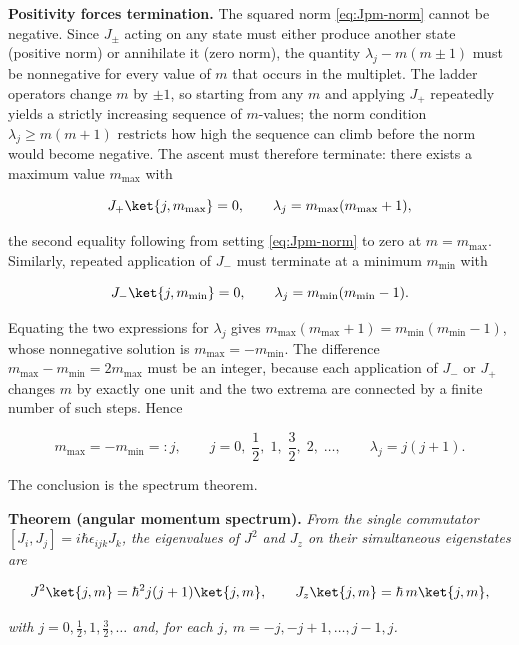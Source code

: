 \medskip\noindent\textbf{Positivity forces termination.} The squared norm \eqref{eq:Jpm-norm} cannot be negative. Since $J_\pm$ acting on any state must either produce another state (positive norm) or annihilate it (zero norm), the quantity $\lambda_j - m(m\pm1)$ must be nonnegative for every value of $m$ that occurs in the multiplet. The ladder operators change $m$ by $\pm1$, so starting from any $m$ and applying $J_+$ repeatedly yields a strictly increasing sequence of $m$-values; the norm condition $\lambda_j \ge m(m+1)$ restricts how high the sequence can climb before the norm would become negative. The ascent must therefore terminate: there exists a maximum value $m_{\max}$ with
\begin{linenomath}
    \begin{equation}
        J_+\ket{j,m_{\max}} = 0,
        \qquad
        \lambda_j = m_{\max}(m_{\max}+1),
    \end{equation}
\end{linenomath}
the second equality following from setting \eqref{eq:Jpm-norm} to zero at $m=m_{\max}$. Similarly, repeated application of $J_-$ must terminate at a minimum $m_{\min}$ with
\begin{linenomath}
    \begin{equation}
        J_-\ket{j,m_{\min}} = 0,
        \qquad
        \lambda_j = m_{\min}(m_{\min}-1).
    \end{equation}
\end{linenomath}
Equating the two expressions for $\lambda_j$ gives $m_{\max}(m_{\max}+1) = m_{\min}(m_{\min}-1)$, whose nonnegative solution is $m_{\max} = -m_{\min}$. The difference $m_{\max} - m_{\min} = 2m_{\max}$ must be an integer, because each application of $J_-$ or $J_+$ changes $m$ by exactly one unit and the two extrema are connected by a finite number of such steps. Hence
\begin{linenomath}
    \begin{equation}
        m_{\max} = -m_{\min} =: j,
        \qquad
        j = 0,\;\frac{1}{2},\;1,\;\frac{3}{2},\;2,\;\ldots,
        \qquad
        \lambda_j = j(j+1).
    \end{equation}
\end{linenomath}
The conclusion is the spectrum theorem.

\medskip\noindent\textbf{Theorem (angular momentum spectrum).} \emph{From the single commutator $[J_i,J_j]=i\hbar\epsilon_{ijk}J_k$, the eigenvalues of $J^2$ and $J_z$ on their simultaneous eigenstates are}
\begin{linenomath}
    \begin{equation}
        J^2\ket{j,m} = \hbar^2 j(j+1)\ket{j,m},\qquad
        J_z\ket{j,m} = \hbar\,m\ket{j,m},
        \label{eq:angular-momentum-spectrum}
    \end{equation}
\end{linenomath}
\emph{with $j = 0,\frac12,1,\frac32,\ldots$ and, for each $j$, $m = -j,-j+1,\ldots,j-1,j$.}

